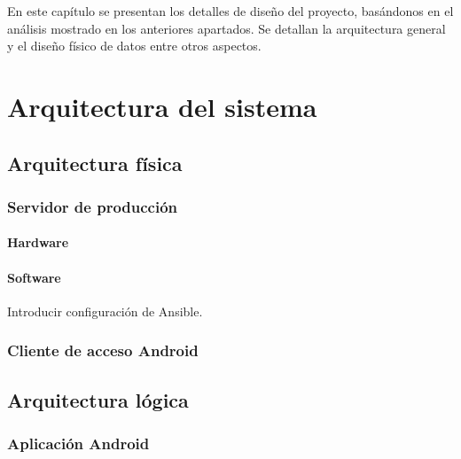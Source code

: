 En este capítulo se presentan los detalles de diseño del proyecto, basándonos en
el análisis mostrado en los anteriores apartados. Se detallan la arquitectura
general y el diseño físico de datos entre otros aspectos.

\section{Arquitectura del sistema}

\subsection{Arquitectura física}
\label{sec:arquitectura-fisica}


\subsubsection{Servidor de producción}
\label{subsec:entorno-produccion}

\paragraph{Hardware}


\paragraph{Software}

Introducir configuración de Ansible.

\subsubsection{Cliente de acceso Android}

\subsection{Arquitectura lógica}


\subsubsection{Aplicación Android}
\label{subsec:arquitectura-logica-android}

